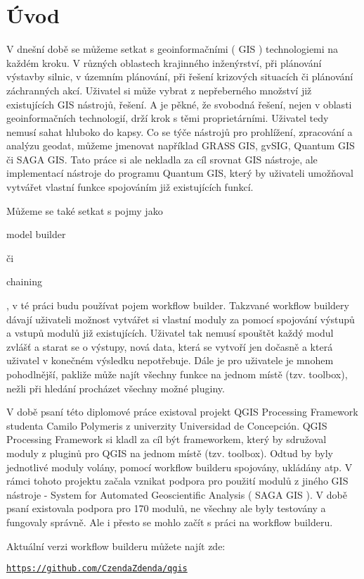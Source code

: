 \chapter*{Úvod}

V dnešní době se můžeme setkat s  geoinformačními ( GIS ) technologiemi na každém kroku. V různých oblastech krajinného inženýrství, při plánování výstavby silnic, v územním plánování, při řešení krizových situacích či plánování záchranných akcí. Uživatel si může vybrat z nepřeberného množství již existujících GIS nástrojů, řešení. A je pěkné, že svobodná řešení, nejen v oblasti geoinformačních technologií, drží krok s těmi proprietárními. Uživatel tedy nemusí sahat hluboko do kapsy. Co se týče nástrojů pro prohlížení, zpracování a analýzu  geodat, můžeme jmenovat například GRASS GIS, gvSIG, Quantum GIS či SAGA GIS. Tato práce si ale nekladla za cíl srovnat GIS nástroje, ale implementací nástroje do programu Quantum GIS, který by uživateli umožňoval vytvářet vlastní funkce spojováním již existujících funkcí.

Můžeme se také setkat s pojmy jako \begin{scriptsize}model builder\end{scriptsize} či \begin{scriptsize}chaining\end{scriptsize}, v té práci budu používat pojem workflow builder. Takzvané workflow buildery dávají uživateli možnost vytvářet si vlastní moduly za pomocí spojování výstupů a vstupů modulů již existujících. Uživatel tak nemusí spouštět každý modul zvlášť a starat se o výstupy, nová data, která se vytvoří jen dočasně a která uživatel v konečném výsledku nepotřebuje. Dále je pro uživatele je mnohem pohodlnější, pakliže může najít všechny funkce na jednom místě (tzv. toolbox), nežli při hledání procházet všechny možné pluginy.

V době psaní této diplomové práce existoval projekt  QGIS Processing Framework studenta Camilo Polymeris z univerzity Universidad de Concepción. QGIS Processing Framework si kladl za cíl být frameworkem, který by sdružoval moduly z pluginů pro QGIS na jednom místě (tzv. toolbox). Odtud by byly jednotlivé moduly volány, pomocí workflow builderu spojovány, ukládány atp. V rámci tohoto projektu začala vznikat podpora pro použití modulů z jiného GIS nástroje - System for Automated Geoscientific Analysis ( SAGA GIS ). V době psaní existovala podpora pro 170 modulů, ne všechny ale byly testovány a fungovaly správně. Ale i přesto se mohlo začít s práci na workflow builderu.

Aktuální verzi workflow builderu můžete najít zde:

\begin{center}
	\href{https://github.com/CzendaZdenda/qgis}{\texttt{https://github.com/CzendaZdenda/qgis}}
\end{center}